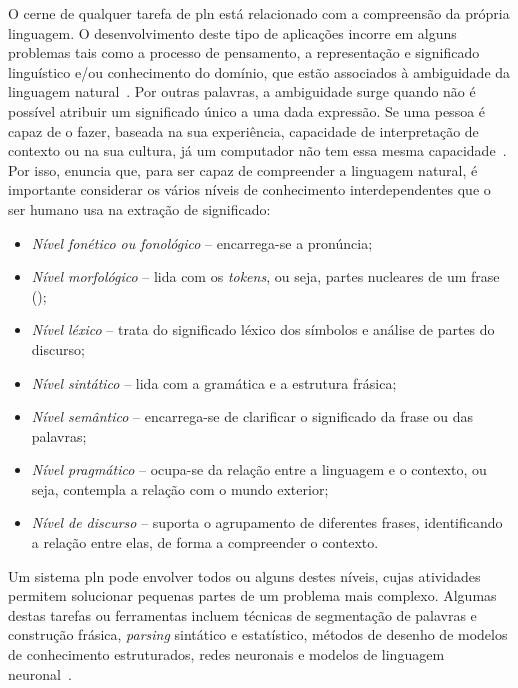 O cerne de qualquer tarefa de \gls{pln} está relacionado com a compreensão da própria linguagem. O desenvolvimento deste tipo de aplicações incorre em alguns problemas tais como a processo de pensamento, a representação e significado linguístico e/ou conhecimento do domínio, que estão associados à ambiguidade da linguagem natural~\parencite{nlp, pln_extracao_conhecimento}. Por outras palavras, a ambiguidade surge quando não é possível atribuir um significado único a uma dada expressão. Se uma pessoa é capaz de o fazer, baseada na sua experiência, capacidade de interpretação de contexto ou na sua cultura, já um computador não tem essa mesma capacidade~\parencite{pln_extracao_conhecimento}. Por isso, \textcite{nlp} enuncia que, para ser capaz de compreender a linguagem natural, é importante considerar os vários níveis de conhecimento interdependentes que o ser humano usa na extração de significado:

\begin{itemize}
    \item 
    {
        \textit{Nível fonético ou fonológico} -- encarrega-se a pronúncia;
    }
    \item
    {
        \textit{Nível morfológico} -- lida com os \textit{tokens}, ou seja, partes nucleares de um frase ();
    }
    \item
    {
        \textit{Nível léxico} -- trata do significado léxico dos símbolos e análise de partes do discurso;
    }
    \item 
    {
        \textit{Nível sintático} -- lida com a gramática e a estrutura frásica;
    }
    \item
    {
        \textit{Nível semântico} -- encarrega-se de clarificar o significado da frase ou das palavras;
    }
    \item
    {
        \textit{Nível pragmático} -- ocupa-se da relação entre a linguagem e o contexto, ou seja, contempla a relação com o mundo exterior;
    }
    \item
    {
        \textit{Nível de discurso} -- suporta o agrupamento de diferentes frases, identificando a relação entre elas, de forma a compreender o contexto.
    }
\end{itemize}

Um sistema \gls{pln} pode envolver todos ou alguns destes níveis, cujas atividades permitem solucionar pequenas partes de um problema mais complexo. Algumas destas tarefas ou ferramentas incluem técnicas de segmentação de palavras e construção frásica, \textit{parsing} sintático e estatístico, métodos de desenho de modelos de conhecimento estruturados, redes neuronais e modelos de linguagem neuronal~\parencite{nlp, speech_language_processing}.

